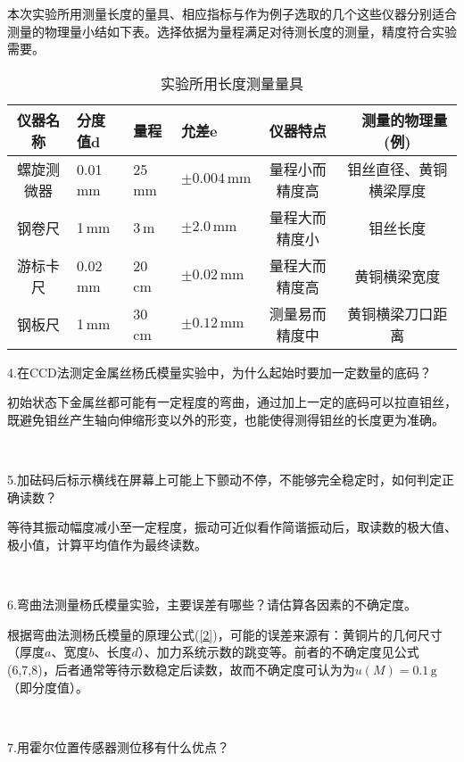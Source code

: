 \documentclass[UTF-8,twoside,cs4size]{ctexart}
\begin{document}
	{\kaishu 本次实验所用测量长度的量具、相应指标与作为例子选取的几个这些仪器分别适合测量的物理量小结如下表。选择依据为量程满足对待测长度的测量，精度符合实验需要。}
	
	\begin{table}[!h]
		\centering
		\renewcommand\arraystretch{1.5}
		\begin{tabularx}{\textwidth}{|c|Y|Y|Y|c|c|}
			\hline
			\textbf{仪器名称} & \textbf{分度值$ \bm d $} & \textbf{量程} &\textbf{允差$ \bm e $}& \textbf{仪器特点} &　\textbf{测量的物理量(例)}\\
			\hline
			螺旋测微器 & 0.01\,mm & 25\,mm &$ \pm0.004\,\mathrm{mm} $& {\small 量程小而精度高} & {\small 钼丝直径、黄铜横梁厚度}\\
			\hline
			钢卷尺 & 1\,mm & 3\,m &$ \pm 2.0\,\mathrm{mm} $& {\small 量程大而精度小} & {\small 钼丝长度}\\
			\hline
			游标卡尺 & 0.02\,mm & 20\,cm &$ \pm0.02\,\mathrm{mm} $& {\small 量程大而精度高} & {\small 黄铜横梁宽度}\\
			\hline
			钢板尺 & 1\,mm & 30\,cm &$ \pm0.12\,\mathrm{mm} $& {\small 测量易而精度中} & {\small 黄铜横梁刀口距离}\\
			\hline
		\end{tabularx}
		\caption{实验所用长度测量量具}
	\end{table}
	
	4.在CCD法测定金属丝杨氏模量实验中，为什么起始时要加一定数量的底码？
	
	{\kaishu 初始状态下金属丝都可能有一定程度的弯曲，通过加上一定的底码可以拉直钼丝，既避免钼丝产生轴向伸缩形变以外的形变，也能使得测得钼丝的长度更为准确。}
	
	~\
	
	5.加砝码后标示横线在屏幕上可能上下颤动不停，不能够完全稳定时，如何判定正确读数？
	
	{\kaishu 等待其振动幅度减小至一定程度，振动可近似看作简谐振动后，取读数的极大值、极小值，计算平均值作为最终读数。}
	
	~\
	
	6.弯曲法测量杨氏模量实验，主要误差有哪些？请估算各因素的不确定度。
	
	{\kaishu 根据弯曲法测杨氏模量的原理公式(\ref{2})，可能的误差来源有：黄铜片的几何尺寸（厚度$ a $、宽度$ b $、长度$ d $）、加力系统示数的跳变等。前者的不确定度见公式(6,7,8)，后者通常等待示数稳定后读数，故而不确定度可认为为$ u(M)=0.1\,\mathrm g $（即分度值）。}
	
	~\
	
	7.用霍尔位置传感器测位移有什么优点？
	
\end{document}
